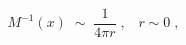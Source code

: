 \begin{equation}\label{eq:small}
M^{-1}(x) \;\sim \; \frac{1}{4\pi r} \;,\;\;\; r \sim 0\;, 
\end{equation}

